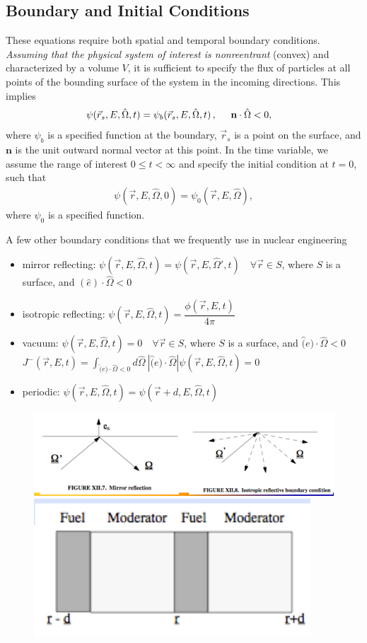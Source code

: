 \documentclass[12pt]{article}
\newcommand{\rvec}{\ensuremath{\vec{r}}}
\newcommand{\omvec}{\ensuremath{\hat{\Omega}}}
\newcommand{\vOmega}{\ensuremath{\hat{\Omega}}}
\begin{document}
\subsection*{Boundary and Initial Conditions}
These equations require both spatial and temporal boundary conditions.
\textit{Assuming that the
physical
system of interest is nonreentrant} (convex) and characterized by a
volume $V$, it is sufficient to specify the flux of
particles at all points of the bounding surface of the system in the incoming
directions. This implies
\begin{align*}
\psi(\rvec_s, E,\omvec,t) &= \psi_b(\rvec_s,E,\omvec,t)\,, \hspace{0.5 cm} \textbf{n} \cdot \omvec <0,
\end{align*}
 where $\psi_b$ is a specified function at the boundary, $\rvec_s$ is a point on the surface, and $\textbf{n}$ is the unit
outward normal vector at this point. In the time variable, we assume the range of
interest $0\leq t<\infty$ and specify the
initial condition at $t=0$, such that
\begin{align*}
\psi(\rvec,E,\omvec,0) = \psi_0(\rvec,E,\omvec),
\end{align*}
 where $\psi_0$ is a specified function.

A few other boundary conditions that we frequently use in nuclear engineering
\begin{itemize}
\item mirror reflecting: $\psi(\vec{r}, E, \vOmega, t) =  \psi(\vec{r}, E, \vOmega', t) \quad \forall \vec{r} \in S$, where $S$ is a surface, and $(\hat e)\cdot \vOmega < 0$
\item isotropic reflecting: $\psi(\vec{r}, E, \vOmega, t) =  \dfrac{\phi(\vec{r}, E, t)}{4\pi}$
\item vacuum: $\psi(\vec{r}, E, \vOmega, t) = 0\quad \forall \vec{r} \in S$, where $S$ is a surface, and $\hat(e)\cdot \vOmega < 0$ \\
$J^-(\vec{r}, E, t) = \int_{\hat(e)\cdot \vOmega < 0} d\vOmega \: |\hat(e)\cdot \vOmega| \psi(\vec{r}, E, \vOmega, t) = 0$
\item periodic: $\psi(\vec{r}, E, \vOmega, t) = \psi(\vec{r} + d, E, \vOmega, t)$
\end{itemize}

\begin{figure}[h!]
    \begin{center}
    \includegraphics[keepaspectratio, width = 3.5 in]{../figs/reflecting-bc}
     \includegraphics[keepaspectratio, width = 2 in]{../figs/periodic-bc}
    \end{center}
\end{figure}
\end{document}
